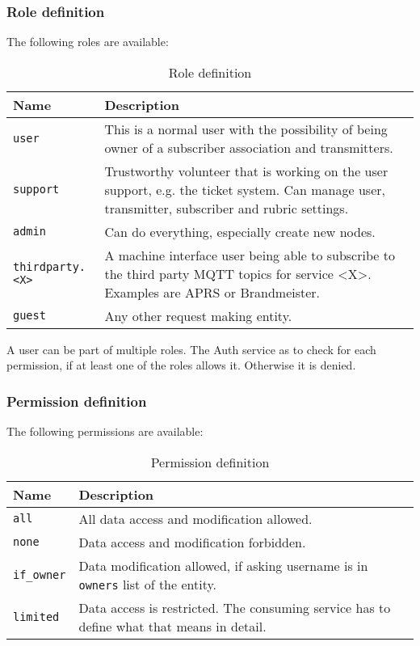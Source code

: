 \subsubsection{Role definition}
The following roles are available:
\begin{table}[htbp!]
\label{tab:protocoldef:permissionmatrix:roledefinition}
  \begin{tabular}{|l|p{11cm}|} \hline
    Name                  & Description \\ \hline \hline
    \verb|user|           & This is a normal user with the possibility of being owner of a subscriber association and transmitters. \\ \hline
    \verb|support|        & Trustworthy volunteer that is working on the user support, e.g. the ticket system. Can manage user, transmitter, subscriber and rubric settings. \\ \hline
    \verb|admin|          & Can do everything, especially create new nodes. \\ \hline
    \verb|thirdparty.<X>| & A machine interface user being able to subscribe to the third party MQTT topics for service <X>. Examples are APRS or Brandmeister. \\ \hline
    \verb|guest|          & Any other request making entity. \\ \hline
  \end{tabular}
  \caption{Role definition}
\end{table}
\FloatBarrier

A user can be part of multiple roles. The Auth service as to check for each permission, if at least one of the roles allows it. Otherwise it is denied.

\subsubsection{Permission definition}
The following permissions are available:

\begin{table}[htbp!]
\label{tab:protocoldef:permissionmatrix:permissiondefinition}
  \begin{tabular}{|l|p{11cm}|} \hline
    Name            & Description \\ \hline \hline
    \verb|all|      & All data access and modification allowed.  \\ \hline
    \verb|none|     & Data access and modification forbidden. \\ \hline
    \verb|if_owner| & Data modification allowed, if asking username is in \verb|owners| list of the entity. \\ \hline
    \verb|limited|  & Data access is restricted. The consuming service has to define what that means in detail. \\ \hline
  \end{tabular}
  \caption{Permission definition}
\end{table}
\FloatBarrier


